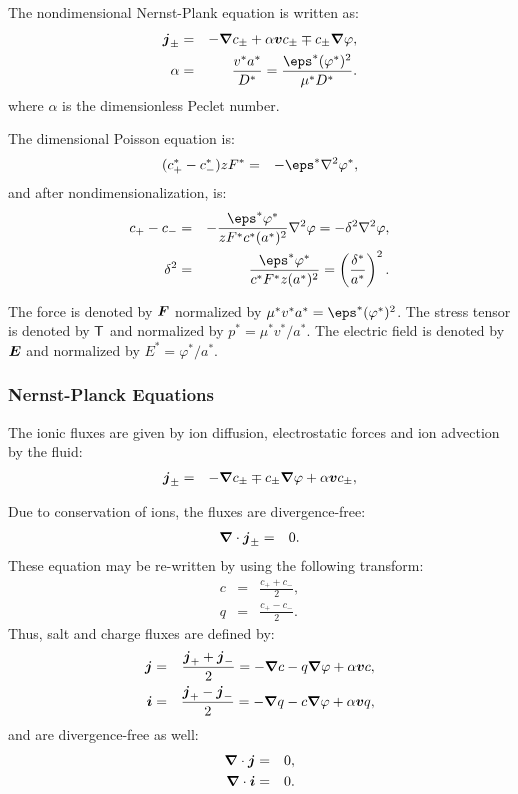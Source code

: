 The nondimensional Nernst-Plank equation is written as:
\begin{eqnarray}
\bj_\pm &=& 
-\bnabla c_\pm + \alpha \bv c_\pm \mp c_\pm \bnabla \varphi, \\
\alpha &=&
\frac{v^* a^*}{D^*} = \frac{\eps^* (\varphi^*)^2}{\mu^* D^*}.
\end{eqnarray}
where $\alpha$ is the dimensionless Peclet number.

The dimensional Poisson equation is:
\begin{eqnarray}
(c^*_+ - c^*_-) z F^* &=& -\eps^* \Laplacian \varphi^*,
\end{eqnarray}
and after nondimensionalization, is:
\begin{eqnarray}
c_+ - c_- &=& -\frac{\eps^* \varphi^*}{z F^* c^* (a^*)^2} \Laplacian \varphi = 
-\delta^2 \Laplacian \varphi,
\\
\delta^2 &=& \frac{\eps^* \varphi^*}{c^* F^* z (a^*)^2} = 
\pars{\frac{\delta^*}{a^*}}^2.
\end{eqnarray}

The force is denoted by $\boldsymbol{F}$ normalized by $\mu^* v^* a^* = \eps^* (\varphi^*)^2$.
The stress tensor is denoted by $\mathsf{T}$ and normalized by $p^* = \mu^* v^* / a^*$.
The electric field is denoted by $\boldsymbol{E}$ and normalized by $E^* = \varphi^* / a^*$.

\subsubsection{Nernst-Planck Equations}
The ionic fluxes are given by ion diffusion, electrostatic forces and ion advection by the fluid:
\begin{eqnarray}
  \boldsymbol{j}_\pm &=& -\boldsymbol{\nabla} c_\pm \mp c_\pm \boldsymbol{\nabla} \varphi + \alpha \boldsymbol{v} c_\pm,
\end{eqnarray}

Due to conservation of ions, the fluxes are divergence-free:
\begin{eqnarray}
\boldsymbol{\nabla} \cdot \boldsymbol{j}_\pm &=& 0.
\end{eqnarray}
These equation may be re-written by using the following transform:
\begin{eqnarray}
  c &=& \frac{c_+ + c_-}{2},\\
  q &=& \frac{c_+ - c_-}{2}.
\end{eqnarray}
Thus, salt and charge fluxes are defined by:
\begin{eqnarray}
  \boldsymbol{j} &=& \frac{\boldsymbol{j}_+ + \boldsymbol{j}_-}{2} = -\boldsymbol{\nabla} c - q \boldsymbol{\nabla} \varphi + \alpha \boldsymbol{v} c, \\
  \boldsymbol{i} &=& \frac{\boldsymbol{j}_+ - \boldsymbol{j}_-}{2} = -\boldsymbol{\nabla} q - c \boldsymbol{\nabla} \varphi + \alpha \boldsymbol{v} q,
\end{eqnarray}
and are divergence-free as well:
\begin{eqnarray}
\boldsymbol{\nabla} \cdot \boldsymbol{j} &=& 0, \\
\boldsymbol{\nabla} \cdot \boldsymbol{i} &=& 0. 
\end{eqnarray}

